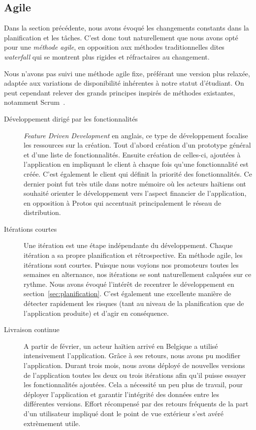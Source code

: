 \documentclass{EPL-master-thesis-covers-FR}
\begin{document}
			\subsection*{Agile}

				Dans la section précédente, nous avons évoqué les changements constants dans la planification et les tâches. C'est donc tout naturellement que nous avons opté pour une \emph{méthode agile}, en opposition aux méthodes traditionnelles dites \emph{waterfall} qui se montrent plus rigides et réfractaires au changement.

				Nous n'avons pas suivi une méthode agile fixe, préférant une version plus relaxée, adaptée aux variations de disponibilité inhérentes à notre statut d'étudiant. On peut cependant relever des grands principes inspirés de méthodes existantes, notamment Scrum~\cite{ref:scrum}.

				\begin{description}
					\item[Développement dirigé par les fonctionnalités] \emph{Feature Driven Development} en anglais, ce type de développement focalise les ressources sur la création. Tout d'abord création d'un prototype général et d'une liste de fonctionnalités. Ensuite création de celles-ci, ajoutées à l'application en impliquant le client à chaque fois qu'une fonctionnalité est créée. C'est également le client qui définit la priorité des fonctionnalités. Ce dernier point fut très utile dans notre mémoire où les acteurs haïtiens ont souhaité orienter le développement vers l'aspect financier de l'application, en opposition à Protos qui accentuait principalement le réseau de distribution.

					\item[Itérations courtes] Une itération est une étape indépendante du développement. Chaque itération a sa propre planification et rétrospective. En méthode agile, les itérations sont courtes. Puisque nous voyions nos promoteurs toutes les semaines en alternance, nos itérations se sont naturellement calquées sur ce rythme. Nous avons évoqué l'intérêt de recentrer le développement en section~\ref{sec:planification}. C'est également une excellente manière de détecter rapidement les risques (tant au niveau de la planification que de l'application produite) et d'agir en conséquence.

					\item[Livraison continue] A partir de février, un acteur haïtien arrivé en Belgique a utilisé intensivement l'application. Grâce à ses retours, nous avons pu modifier l'application. Durant trois mois, nous avons déployé de nouvelles versions de l'application toutes les deux ou trois itérations afin qu'il puisse essayer les fonctionnalités ajoutées. Cela a nécessité un peu plus de travail, pour déployer l'application et garantir l'intégrité des données entre les différentes versions. Effort récompensé par des retours fréquents de la part d'un utilisateur impliqué dont le point de vue extérieur s'est avéré extrèmement utile.
				\end{description}
\end{document}
